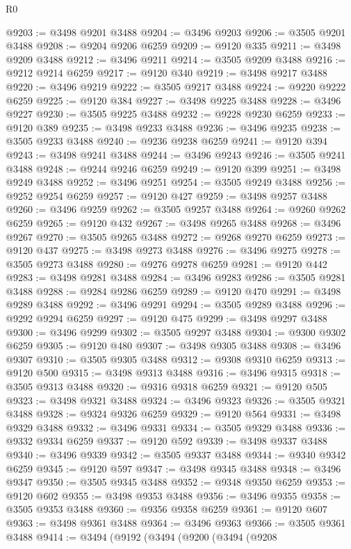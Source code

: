\begin{lexlean}{R0}
\begin{coremodule}
@9203 := @3498 @9201 @3488
@9204 := @3496 @9203
@9206 := @3505 @9201 @3488
@9208 := @9204 @9206 @6259
@9209 := @9120 @335
@9211 := @3498 @9209 @3488
@9212 := @3496 @9211
@9214 := @3505 @9209 @3488
@9216 := @9212 @9214 @6259
@9217 := @9120 @340
@9219 := @3498 @9217 @3488
@9220 := @3496 @9219
@9222 := @3505 @9217 @3488
@9224 := @9220 @9222 @6259
@9225 := @9120 @384
@9227 := @3498 @9225 @3488
@9228 := @3496 @9227
@9230 := @3505 @9225 @3488
@9232 := @9228 @9230 @6259
@9233 := @9120 @389
@9235 := @3498 @9233 @3488
@9236 := @3496 @9235
@9238 := @3505 @9233 @3488
@9240 := @9236 @9238 @6259
@9241 := @9120 @394
@9243 := @3498 @9241 @3488
@9244 := @3496 @9243
@9246 := @3505 @9241 @3488
@9248 := @9244 @9246 @6259
@9249 := @9120 @399
@9251 := @3498 @9249 @3488
@9252 := @3496 @9251
@9254 := @3505 @9249 @3488
@9256 := @9252 @9254 @6259
@9257 := @9120 @427
@9259 := @3498 @9257 @3488
@9260 := @3496 @9259
@9262 := @3505 @9257 @3488
@9264 := @9260 @9262 @6259
@9265 := @9120 @432
@9267 := @3498 @9265 @3488
@9268 := @3496 @9267
@9270 := @3505 @9265 @3488
@9272 := @9268 @9270 @6259
@9273 := @9120 @437
@9275 := @3498 @9273 @3488
@9276 := @3496 @9275
@9278 := @3505 @9273 @3488
@9280 := @9276 @9278 @6259
@9281 := @9120 @442
@9283 := @3498 @9281 @3488
@9284 := @3496 @9283
@9286 := @3505 @9281 @3488
@9288 := @9284 @9286 @6259
@9289 := @9120 @470
@9291 := @3498 @9289 @3488
@9292 := @3496 @9291
@9294 := @3505 @9289 @3488
@9296 := @9292 @9294 @6259
@9297 := @9120 @475
@9299 := @3498 @9297 @3488
@9300 := @3496 @9299
@9302 := @3505 @9297 @3488
@9304 := @9300 @9302 @6259
@9305 := @9120 @480
@9307 := @3498 @9305 @3488
@9308 := @3496 @9307
@9310 := @3505 @9305 @3488
@9312 := @9308 @9310 @6259
@9313 := @9120 @500
@9315 := @3498 @9313 @3488
@9316 := @3496 @9315
@9318 := @3505 @9313 @3488
@9320 := @9316 @9318 @6259
@9321 := @9120 @505
@9323 := @3498 @9321 @3488
@9324 := @3496 @9323
@9326 := @3505 @9321 @3488
@9328 := @9324 @9326 @6259
@9329 := @9120 @564
@9331 := @3498 @9329 @3488
@9332 := @3496 @9331
@9334 := @3505 @9329 @3488
@9336 := @9332 @9334 @6259
@9337 := @9120 @592
@9339 := @3498 @9337 @3488
@9340 := @3496 @9339
@9342 := @3505 @9337 @3488
@9344 := @9340 @9342 @6259
@9345 := @9120 @597
@9347 := @3498 @9345 @3488
@9348 := @3496 @9347
@9350 := @3505 @9345 @3488
@9352 := @9348 @9350 @6259
@9353 := @9120 @602
@9355 := @3498 @9353 @3488
@9356 := @3496 @9355
@9358 := @3505 @9353 @3488
@9360 := @9356 @9358 @6259
@9361 := @9120 @607
@9363 := @3498 @9361 @3488
@9364 := @3496 @9363
@9366 := @3505 @9361 @3488
@9414 := @3494
    (@9192
      (@3494
        (@9200
          (@3494
            (@9208

\end{coremodule}
\end{lexlean}
